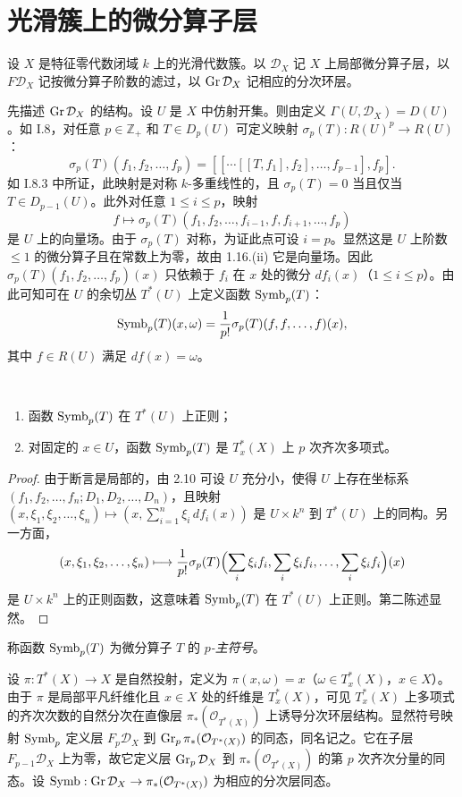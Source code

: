 \section{光滑簇上的微分算子层}

设 $X$ 是特征零代数闭域 $k$ 上的光滑代数簇。以 $\mathcal{D}_X$ 记 $X$ 上局部微分算子层，以 $F\mathcal{D}_X$ 记按微分算子阶数的滤过，以 $\operatorname{Gr}\mathcal{D}_X$ 记相应的分次环层。

先描述 $\operatorname{Gr}\mathcal{D}_X$ 的结构。设 $U$ 是 $X$ 中仿射开集。则由定义 $\Gamma(U,\mathcal{D}_X)=D(U)$。如 I.8，对任意 $p\in\mathbb{Z}_+$ 和 $T\in D_p(U)$ 可定义映射 $\sigma_p(T):R(U)^p\to R(U)$：
$$\sigma_p(T)(f_1,f_2,\dots,f_p)=[[\cdots[[T,f_1],f_2],\dots,f_{p-1}],f_p].$$
如 I.8.3 中所证，此映射是对称 $k$-多重线性的，且 $\sigma_p(T)=0$ 当且仅当 $T\in D_{p-1}(U)$。此外对任意 $1\le i\le p$，映射
$$f\longmapsto\sigma_p(T)(f_1,f_2,\dots,f_{i-1},f,f_{i+1},\dots,f_p)$$
是 $U$ 上的向量场。由于 $\sigma_p(T)$ 对称，为证此点可设 $i=p$。显然这是 $U$ 上阶数 $\le 1$ 的微分算子且在常数上为零，故由 1.16.(ii) 它是向量场。因此 $\sigma_p(T)(f_1,f_2,\dots,f_p)(x)$ 只依赖于 $f_i$ 在 $x$ 处的微分 $df_i(x)$（$1\le i\le p$）。由此可知可在 $U$ 的余切丛 $T^*(U)$ 上定义函数 $\operatorname{Symb}_p(T)$：
$$\operatorname{Symb}_p(T)(x,\omega)=\frac{1}{p!}\sigma_p(T)(f,f,\dots,f)(x),$$
其中 $f\in R(U)$ 满足 $df(x)=\omega$。

\begin{lemma}\ 
\begin{enumerate}[label=(\roman*)]
  \item 函数 $\operatorname{Symb}_p(T)$ 在 $T^*(U)$ 上正则；
  \item 对固定的 $x\in U$，函数 $\operatorname{Symb}_p(T)$ 是 $T^*_x(X)$ 上 $p$ 次齐次多项式。
\end{enumerate}
\end{lemma}

\begin{proof}
由于断言是局部的，由 2.10 可设 $U$ 充分小，使得 $U$ 上存在坐标系 $(f_1,f_2,\dots,f_n;D_1,D_2,\dots,D_n)$，且映射 $(x,\xi_1,\xi_2,\dots,\xi_n)\longmapsto(x,\sum_{i=1}^n\xi_i\,df_i(x))$ 是 $U\times k^n$ 到 $T^*(U)$ 上的同构。另一方面，
$$(x,\xi_1,\xi_2,\dots,\xi_n)\longmapsto\frac{1}{p!}\sigma_p(T)\Bigl(\sum_i\xi_if_i,\sum_i\xi_if_i,\dots,\sum_i\xi_if_i\Bigr)(x)$$
是 $U\times k^n$ 上的正则函数，这意味着 $\operatorname{Symb}_p(T)$ 在 $T^*(U)$ 上正则。第二陈述显然。
\end{proof}

称函数 $\operatorname{Symb}_p(T)$ 为微分算子 $T$ 的 \emph{$p$-主符号}。

设 $\pi:T^*(X)\to X$ 是自然投射，定义为 $\pi(x,\omega)=x$（$\omega\in T^*_x(X)$，$x\in X$）。由于 $\pi$ 是局部平凡纤维化且 $x\in X$ 处的纤维是 $T^*_x(X)$，可见 $T^*_x(X)$ 上多项式的齐次次数的自然分次在直像层 $\pi_*(\mathcal{O}_{T^*(X)})$ 上诱导分次环层结构。显然符号映射 $\operatorname{Symb}_p$ 定义层 $F_p\mathcal{D}_X$ 到 $\operatorname{Gr}_p\pi_*(\mathcal{O}_{T^*(X)})$ 的同态，同名记之。它在子层 $F_{p-1}\mathcal{D}_X$ 上为零，故它定义层 $\operatorname{Gr}_p\mathcal{D}_X$ 到 $\pi_*(\mathcal{O}_{T^*(X)})$ 的第 $p$ 次齐次分量的同态。设 $\operatorname{Symb}:\operatorname{Gr}\mathcal{D}_X\to\pi_*(\mathcal{O}_{T^*(X)})$ 为相应的分次层同态。

